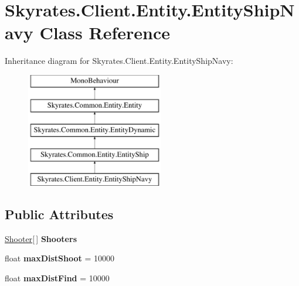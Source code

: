 \hypertarget{class_skyrates_1_1_client_1_1_entity_1_1_entity_ship_navy}{\section{Skyrates.\-Client.\-Entity.\-Entity\-Ship\-Navy Class Reference}
\label{class_skyrates_1_1_client_1_1_entity_1_1_entity_ship_navy}
}
Inheritance diagram for Skyrates.\-Client.\-Entity.\-Entity\-Ship\-Navy\-:\begin{figure}[H]
\begin{center}
\leavevmode
\includegraphics[height=5.000000cm]{class_skyrates_1_1_client_1_1_entity_1_1_entity_ship_navy}
\end{center}
\end{figure}
\subsection*{Public Attributes}
\begin{DoxyCompactItemize}
\item 
\hypertarget{class_skyrates_1_1_client_1_1_entity_1_1_entity_ship_navy_a3e716c406054959be4eee5b259eee3df}{\hyperlink{class_shooter}{Shooter}\mbox{[}$\,$\mbox{]} {\bfseries Shooters}}\label{class_skyrates_1_1_client_1_1_entity_1_1_entity_ship_navy_a3e716c406054959be4eee5b259eee3df}

\item 
\hypertarget{class_skyrates_1_1_client_1_1_entity_1_1_entity_ship_navy_a55c9aa1de27939eb381e0dca2409d26a}{float {\bfseries max\-Dist\-Shoot} = 10000}\label{class_skyrates_1_1_client_1_1_entity_1_1_entity_ship_navy_a55c9aa1de27939eb381e0dca2409d26a}

\item 
\hypertarget{class_skyrates_1_1_client_1_1_entity_1_1_entity_ship_navy_a881bed5b4ed777b3aa7b8982e79e5323}{float {\bfseries max\-Dist\-Find} = 10000}\label{class_skyrates_1_1_client_1_1_entity_1_1_entity_ship_navy_a881bed5b4ed777b3aa7b8982e79e5323}

\end{DoxyCompactItemize}
